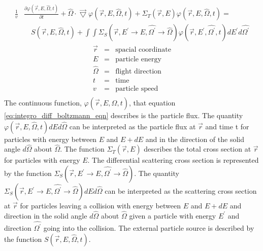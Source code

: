 \begin{equation}
  \begin{split}
    \frac{1}{v}&\frac{\partial \varphi(\vec{r},E,\hat{\Omega},t)}{\partial t} +
    \hat{\Omega} \cdot \vec{\bigtriangledown} \varphi(\vec{r},E,\hat{\Omega},t)
    + \Sigma_T(\vec{r},E) \varphi(\vec{r},E,\hat{\Omega},t) = \\
    & \quad S(\vec{r},E,\hat{\Omega},t) +
    \int\int \Sigma_S(\vec{r},E^{'} \to E,\hat{\Omega^{'}} \to \hat{\Omega})
    \varphi(\vec{r},E^{'},\hat{\Omega^{'}},t) dE^{'}d\hat{\Omega^{'}} 
  \end{split}
  \label{eq:integro_diff_boltzmann_eqn}
\end{equation}
\begin{eqnarray*}
  \vec{r} & = & \text{spacial coordinate} \nonumber \\
  E & = & \text{particle energy} \nonumber \\
  \hat{\Omega} & = & \text{flight direction} \nonumber \\
  t & = & \text{time} \nonumber \\
  v & = & \text{particle speed} \nonumber \\
\end{eqnarray*}
The continuous function, $\varphi(\vec{r},E,\hat{\Omega},t)$, that equation 
\ref{eq:integro_diff_boltzmann_eqn} describes is the particle flux. The
quantity $\varphi(\vec{r},E,\hat{\Omega},t)dEd\hat{\Omega}$ can be interpreted
as the particle flux at $\vec{r}$ and time t for particles with energy between
$E$ and $E + dE$ and in the direction of the solid angle $d\hat{\Omega}$ about
$\hat{\Omega}$. The function $\Sigma_T(\vec{r},E)$ describes the total cross
section at $\vec{r}$ for particles with energy $E$. The differential scattering
cross section is represented by the function 
$\Sigma_S(\vec{r},E^{'} \to E,\hat{\Omega^{'}} \to \hat{\Omega})$. The quantity
$\Sigma_S(\vec{r},E^{'} \to E,\hat{\Omega^{'}} \to \hat{\Omega})dEd\hat{\Omega}$
can be interpreted as the scattering cross section at $\vec{r}$ for particles
leaving a collision with energy between $E$ and $E+dE$ and direction in the
solid angle $d\hat{\Omega}$ about $\hat{\Omega}$ given a particle with energy
$E^{'}$ and direction $\hat{\Omega^{'}}$ going into the collision. The external
particle source is described by the function $S(\vec{r},E,\hat{\Omega},t)$.


